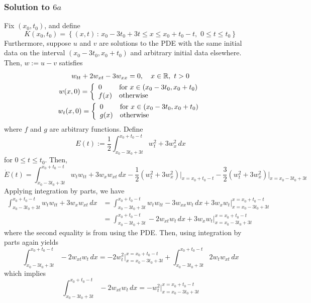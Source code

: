 \subsubsection*{Solution to $6a$}
Fix $(x_0,t_0)$, and define
$$
K(x_0,t_0) = \left\{ (x,t) \, : \, x_0 - 3t_0 + 3t \leq x \leq x_0 + t_0 - t, \,\, 0 \leq t \leq t_0 \right\}
$$
Furthermore, suppose $u$ and $v$ are solutions to the PDE with the same initial data on the interval $(x_0-3t_0, x_0+t_0)$ and arbitrary initial data elsewhere. Then, $w:= u-v$ satisfies
\begin{gather*}
w_{tt} + 2w_{xt} - 3w_{xx} = 0, \quad x \in \mathbb{R}, \,\, t > 0 \\
w(x,0) = \left\{
\begin{array}{ll}
0 & \text{for} \,\, x \in (x_0-3t_0, x_0+t_0) \\
f(x) & \text{otherwise}
\end{array} \right. \\
w_t(x,0) = \left\{
\begin{array}{ll}
0 & \text{for} \,\, x \in (x_0-3t_0, x_0+t_0) \\
g(x) & \text{otherwise}
\end{array} \right.
\end{gather*}
where $f$ and $g$ are arbitrary functions. Define
$$ E(t) := \frac{1}{2} \int_{x_0 - 3t_0 + 3t}^{x_0 + t_0 - t} w_t^2 + 3w_x^2 \, dx $$
for $0 \leq t \leq t_0$. Then,
\begin{equation}
\label{f1161}
\dot{E}(t) = \int_{x_0 - 3t_0 + 3t}^{x_0 + t_0 - t} w_t w_{tt} + 3 w_x w_{xt} \, dx - \frac{1}{2} (w_t^2 + 3w_x^2) \bigg|_{x = x_0 + t_0 - t} - \frac{3}{2} (w_t^2 + 3w_x^2) \bigg|_{x = x_0 -3t_0 + 3t}
\end{equation}
Applying integration by parts, we have
\begin{align*}
\int_{x_0 - 3t_0 + 3t}^{x_0 + t_0 - t} w_t w_{tt} + 3 w_x w_{xt} \, dx &= \int_{x_0 - 3t_0 + 3t}^{x_0 + t_0 - t} w_t w_{tt} - 3 w_{xx} w_{t} \, dx + 3w_x w_t \bigg|_{x=x_0 - 3t_0 + 3t}^{x=x_0 + t_0 - t} \\
&= \int_{x_0 - 3t_0 + 3t}^{x_0 + t_0 - t} -2 w_{xt} w_t \, dx + 3w_x w_t \bigg|_{x=x_0 - 3t_0 + 3t}^{x=x_0 + t_0 - t}
\end{align*}
where the second equality is from using the PDE. Then, using integration by parts again yields
$$ \int_{x_0 - 3t_0 + 3t}^{x_0 + t_0 - t} -2 w_{xt} w_t \, dx = -2w_t^2 \bigg|_{x=x_0 - 3t_0 + 3t}^{x=x_0 + t_0 - t} + \int_{x_0 - 3t_0 + 3t}^{x_0 + t_0 - t} 2w_{t}w_{xt} \, dx $$
which implies
$$ \int_{x_0 - 3t_0 + 3t}^{x_0 + t_0 - t} -2w_{xt} w_t \, dx = -w_t^2 \bigg|_{x=x_0 - 3t_0 + 3t}^{x=x_0 + t_0 - t} $$
